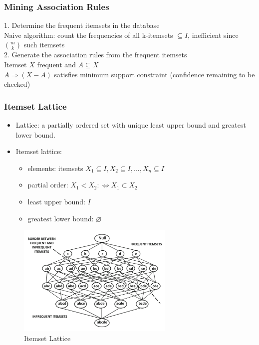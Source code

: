 \documentclass{article}
\begin{document}
\subsubsection{Mining Association Rules}
1. Determine the frequent itemsets in the database \\
Naive algorithm: count the frequencies of all k-itemsets $\subseteq I$, inefficient since $\binom mk$ such itemsets \\

2. Generate the association rules from the frequent itemsets \\
Itemset $X$ frequent and $A \subseteq X$ \\
$A \Rightarrow (X-A)$ satisfies minimum support constraint (confidence remaining to be checked)

\subsubsection{Itemset Lattice}
\begin{itemize}
  \item Lattice: a partially ordered set with unique least upper bound and greatest lower bound.
  \item Itemset lattice:
    \begin{itemize}
      \item elements: itemsets $X_1 \subseteq I, X_2 \subseteq I, ..., X_n \subseteq I$
      \item partial order: $X_1 < X_2 :\Leftrightarrow X_1 \subset X_2$
      \item least upper bound: $I$
      \item greatest lower bound: $\varnothing$
    \end{itemize}
\end{itemize}

\begin{figure}[h]
\centering
\caption{Itemset Lattice}
\includegraphics[width=7.5cm]{img/pic4-1.png}
\end{figure}
\end{document}
